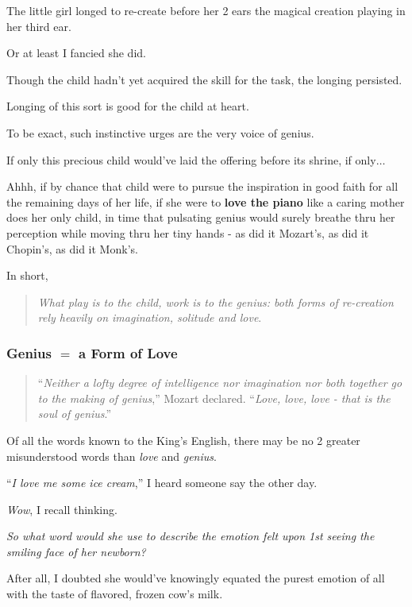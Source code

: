 \documentclass{article}
\begin{document}
%
The little girl longed to re-create before her 2 ears the magical creation playing in her third ear.

Or at least I fancied she did.

%
Though the child hadn't yet acquired the skill for the task, the longing persisted.

Longing of this sort is good for the child at heart.

To be exact, such instinctive urges are the very voice of genius.

%
If only this precious child would've laid the offering before its shrine, if only$\ldots$

%
Ahhh, if by chance that child were to pursue the inspiration in good faith for all the remaining days of her life, if she were to \textbf{love the piano} like a caring mother does her only child, in time that pulsating genius would surely breathe thru her perception while moving thru her tiny hands - as did it Mozart's, as did it Chopin's, as did it Monk's.

%
In short,

\begin{quotation}
	\textit{What play is to the child, work is to the genius: both forms of re-creation rely heavily on imagination, solitude and love}.
\end{quotation}

\subsubsection{Genius $=$ a Form of Love}

\begin{quotation}
	``\textit{Neither a lofty degree of intelligence nor imagination nor both together go to the making of genius},'' Mozart declared. ``\textit{Love, love, love - that is the soul of genius}.''
\end{quotation}
Of all the words known to the King's English, there may be no 2 greater misunderstood words than \textit{love} and \textit{genius}.

%
``\textit{I love me some ice cream},'' I heard someone say the other day.

%
\textit{Wow}, I recall thinking.

\textit{So what word would she use to describe the emotion felt upon 1st seeing the smiling face of her newborn?}

After all, I doubted she would've knowingly equated the purest emotion of all with the taste of flavored, frozen cow's milk.
\end{document}
